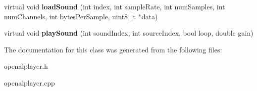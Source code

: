 \begin{DoxyCompactItemize}
\item 
\hypertarget{classg2c_1_1_open_a_l_player_aab9a0225972c9dd7a03b27d073ef713b}{
virtual void {\bfseries loadSound} (int index, int sampleRate, int numSamples, int numChannels, int bytesPerSample, uint8\_\-t $\ast$data)}
\label{classg2c_1_1_open_a_l_player_aab9a0225972c9dd7a03b27d073ef713b}

\item 
\hypertarget{classg2c_1_1_open_a_l_player_a3501ac69bb3025b2aeb7b804be65d6c0}{
virtual void {\bfseries playSound} (int soundIndex, int sourceIndex, bool loop, double gain)}
\label{classg2c_1_1_open_a_l_player_a3501ac69bb3025b2aeb7b804be65d6c0}

\end{DoxyCompactItemize}


The documentation for this class was generated from the following files:\begin{DoxyCompactItemize}
\item 
openalplayer.h\item 
openalplayer.cpp\end{DoxyCompactItemize}

